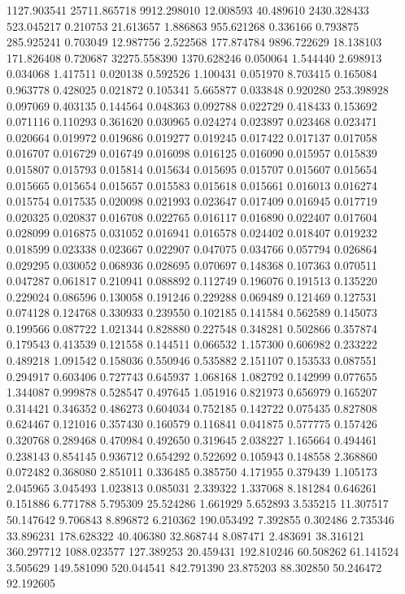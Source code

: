 1127.903541
25711.865718
9912.298010
12.008593
40.489610
2430.328433
523.045217
0.210753
21.613657
1.886863
955.621268
0.336166
0.793875
285.925241
0.703049
12.987756
2.522568
177.874784
9896.722629
18.138103
171.826408
0.720687
32275.558390
1370.628246
0.050064
1.544440
2.698913
0.034068
1.417511
0.020138
0.592526
1.100431
0.051970
8.703415
0.165084
0.963778
0.428025
0.021872
0.105341
5.665877
0.033848
0.920280
253.398928
0.097069
0.403135
0.144564
0.048363
0.092788
0.022729
0.418433
0.153692
0.071116
0.110293
0.361620
0.030965
0.024274
0.023897
0.023468
0.023471
0.020664
0.019972
0.019686
0.019277
0.019245
0.017422
0.017137
0.017058
0.016707
0.016729
0.016749
0.016098
0.016125
0.016090
0.015957
0.015839
0.015807
0.015793
0.015814
0.015634
0.015695
0.015707
0.015607
0.015654
0.015665
0.015654
0.015657
0.015583
0.015618
0.015661
0.016013
0.016274
0.015754
0.017535
0.020098
0.021993
0.023647
0.017409
0.016945
0.017719
0.020325
0.020837
0.016708
0.022765
0.016117
0.016890
0.022407
0.017604
0.028099
0.016875
0.031052
0.016941
0.016578
0.024402
0.018407
0.019232
0.018599
0.023338
0.023667
0.022907
0.047075
0.034766
0.057794
0.026864
0.029295
0.030052
0.068936
0.028695
0.070697
0.148368
0.107363
0.070511
0.047287
0.061817
0.210941
0.088892
0.112749
0.196076
0.191513
0.135220
0.229024
0.086596
0.130058
0.191246
0.229288
0.069489
0.121469
0.127531
0.074128
0.124768
0.330933
0.239550
0.102185
0.141584
0.562589
0.145073
0.199566
0.087722
1.021344
0.828880
0.227548
0.348281
0.502866
0.357874
0.179543
0.413539
0.121558
0.144511
0.066532
1.157300
0.606982
0.233222
0.489218
1.091542
0.158036
0.550946
0.535882
2.151107
0.153533
0.087551
0.294917
0.603406
0.727743
0.645937
1.068168
1.082792
0.142999
0.077655
1.344087
0.999878
0.528547
0.497645
1.051916
0.821973
0.656979
0.165207
0.314421
0.346352
0.486273
0.604034
0.752185
0.142722
0.075435
0.827808
0.624467
0.121016
0.357430
0.160579
0.116841
0.041875
0.577775
0.157426
0.320768
0.289468
0.470984
0.492650
0.319645
2.038227
1.165664
0.494461
0.238143
0.854145
0.936712
0.654292
0.522692
0.105943
0.148558
2.368860
0.072482
0.368080
2.851011
0.336485
0.385750
4.171955
0.379439
1.105173
2.045965
3.045493
1.023813
0.085031
2.339322
1.337068
8.181284
0.646261
0.151886
6.771788
5.795309
25.524286
1.661929
5.652893
3.535215
11.307517
50.147642
9.706843
8.896872
6.210362
190.053492
7.392855
0.302486
2.735346
33.896231
178.628322
40.406380
32.868744
8.087471
2.483691
38.316121
360.297712
1088.023577
127.389253
20.459431
192.810246
60.508262
61.141524
3.505629
149.581090
520.044541
842.791390
23.875203
88.302850
50.246472
92.192605
